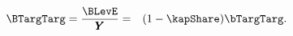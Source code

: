 \begin{eqnarray}
\BTargTarg = \frac{\BLevE}{\GDPLev} & = & (1-\kapShare ) \bTargTarg.
\label{eq:BRatEStakes}
\end{eqnarray}
